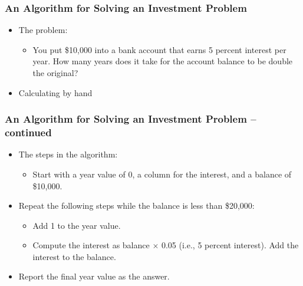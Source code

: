 \documentclass{beamer}
\begin{document}
\begin{frame}[t,fragile] \frametitle{An Algorithm for Solving an Investment Problem} %
    \begin{itemize}
        \item The problem:
        \begin{itemize}
            \item You put \$10,000 into a bank account that earns 5 percent interest per year. How many years does it take for the account balance to be double the original?
        \end{itemize}
        \item Calculating by hand
    \end{itemize}
\end{frame}

\begin{frame}[t,fragile] \frametitle{An Algorithm for Solving an Investment Problem -- continued} %
    \begin{itemize}
        \item The steps in the algorithm:
        \begin{itemize}
            \item Start with a year value of 0, a column for the interest, and a balance of \$10,000.
        \end{itemize}
        \item Repeat the following steps while the balance is less than \$20,000:
        \begin{itemize}
            \item Add 1 to the year value.
            \item Compute the interest as balance $\times$ 0.05 (i.e., 5 percent interest). Add the interest to the balance.
        \end{itemize}
        \item Report the final year value as the answer.
    \end{itemize}
\end{frame}
\end{document}
